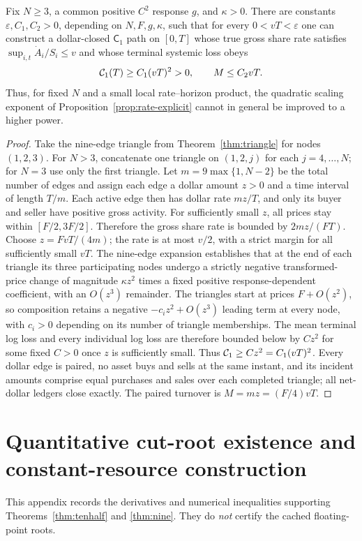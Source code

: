 \documentclass[review,hidelinks,onefignum,onetabnum]{siamonline250211}%
\begin{document}
\begin{proposition}
\label{prop:rate-local-match}
Fix $N\ge3$, a common positive $C^2$ response $g$, and
$\kappa>0$. There are constants $\varepsilon,C_1,C_2>0$,
depending on $N,F,g,\kappa$, such that for every
$0<vT<\varepsilon$ one can construct a dollar-closed
$\mathsf C_1$ path on $[0,T]$ whose true gross share rate
satisfies $\sup_{i,t}\dot A_i/S_i\le v$ and whose terminal
systemic loss obeys
\begin{equation}\label{eq:rate-match}
 \mathcal{C}_1(T)\ge C_1(vT)^2>0,
 \qquad M\le C_2 vT.
\end{equation}
Thus, for fixed $N$ and a small local rate--horizon product,
the quadratic scaling exponent of
Proposition~\ref{prop:rate-explicit} cannot in general be
improved to a higher power.
\end{proposition}
\begin{proof}
Take the nine-edge triangle from
Theorem~\ref{thm:triangle} for nodes $(1,2,3)$. For
$N>3$, concatenate one triangle on $(1,2,j)$ for each
$j=4,\ldots,N$; for $N=3$ use only the first triangle.
Let $m=9\max\{1,N-2\}$ be the total number of edges and
assign each edge a dollar amount $z>0$ and a time interval
of length $T/m$. Each active edge then has dollar rate
$mz/T$, and only its buyer and seller have positive gross
activity. For sufficiently small $z$, all prices stay within
$[F/2,3F/2]$. Therefore the gross share rate is bounded by
$2mz/(FT)$. Choose $z=FvT/(4m)$; the rate is at most
$v/2$, with a strict margin for all sufficiently small $vT$.
The nine-edge expansion establishes that at the end of each
triangle its three participating nodes undergo a strictly
negative transformed-price change of magnitude
$\kappa z^2$ times a fixed positive response-dependent
coefficient, with an $O(z^3)$ remainder. The triangles
start at prices $F+O(z^2)$, so composition retains a negative
$-c_i z^2+O(z^3)$ leading term at every node, with
$c_i>0$ depending on its number of triangle memberships.
The mean terminal log loss and every individual log loss
are therefore bounded below by $C z^2$ for some fixed
$C>0$ once $z$ is sufficiently small. Thus
$\mathcal{C}_1\ge C z^2=C_1(vT)^2$.
Every dollar edge is paired, no asset buys and sells at the same
instant, and its incident amounts comprise equal purchases and
sales over each completed triangle; all net-dollar ledgers close
exactly. The paired turnover is $M=m z=(F/4)vT$.
\end{proof}

\section{Quantitative cut-root existence and constant-resource construction}
\label{app:smoothing}
This appendix records the derivatives and numerical inequalities
supporting Theorems~\ref{thm:tenhalf} and \ref{thm:nine}.
They do \emph{not} certify the cached floating-point roots.
\end{document}
